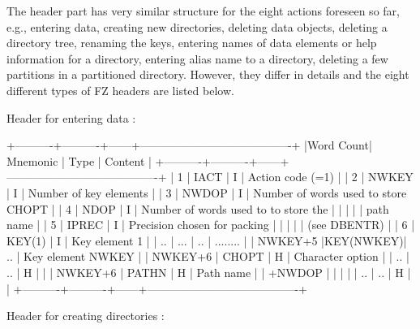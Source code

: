The header part has very similar structure for the eight actions
foreseen so far, e.g., entering data, creating new directories, deleting
data objects, deleting a directory tree, renaming the keys, entering
names of data elements or help information for a directory, entering
alias name to a directory, deleting a few partitions in a partitioned
directory. However, they differ in details and the eight different types
of FZ headers are listed below.
\begin{XMP}

   Header for entering data :

 +----------+----------+------+----------------------------------------+
 |Word Count| Mnemonic | Type |         Content                        |
 +----------+----------+------+----------------------------------------+
 |        1 |   IACT   |   I  | Action code (=1)                       |
 |        2 |  NWKEY   |   I  | Number of key elements                 |
 |        3 |  NWDOP   |   I  | Number of words used to store CHOPT    |
 |        4 |   NDOP   |   I  | Number of words used to to store the   |
 |          |          |      | path name                              |
 |        5 |  IPREC   |   I  | Precision chosen for packing           |
 |          |          |      | (see DBENTR)                           |
 |        6 |  KEY(1)  |   I  | Key element 1                          |
 |       .. |   ...    |  ..  |   ........                             |
 |  NWKEY+5 |KEY(NWKEY)|  ..  | Key element NWKEY                      |
 |  NWKEY+6 |  CHOPT   |   H  | Character option                       |
 |       .. |     ..   |   H  |                                        |
 |  NWKEY+6 |  PATHN   |   H  | Path name                              |
 |   +NWDOP |          |      |                                        |
 |       .. |     ..   |   H  |                                        |
 +----------+----------+------+----------------------------------------+

   Header for creating directories :


\end{XMP}
